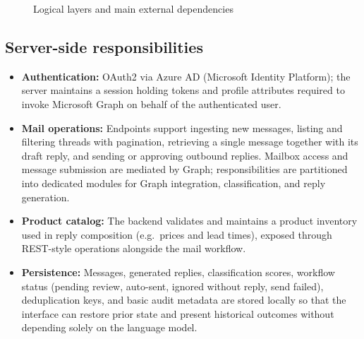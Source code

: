 \documentclass[12pt]{article}
\begin{document}
\begin{figure}[htbp]
\centering
{}
\caption{Logical layers and main external dependencies}
\label{fig:arch}
\end{figure}

\subsection{Server-side responsibilities}
\begin{itemize}
  \item \textbf{Authentication:} OAuth2 via Azure AD (Microsoft Identity Platform); the server maintains a session holding tokens and profile attributes required to invoke Microsoft Graph on behalf of the authenticated user.
  \item \textbf{Mail operations:} Endpoints support ingesting new messages, listing and filtering threads with pagination, retrieving a single message together with its draft reply, and sending or approving outbound replies. Mailbox access and message submission are mediated by Graph; responsibilities are partitioned into dedicated modules for Graph integration, classification, and reply generation.
  \item \textbf{Product catalog:} The backend validates and maintains a product inventory used in reply composition (e.g.\ prices and lead times), exposed through REST-style operations alongside the mail workflow.
  \item \textbf{Persistence:} Messages, generated replies, classification scores, workflow status (pending review, auto-sent, ignored without reply, send failed), deduplication keys, and basic audit metadata are stored locally so that the interface can restore prior state and present historical outcomes without depending solely on the language model.
\end{itemize}
\end{document}
